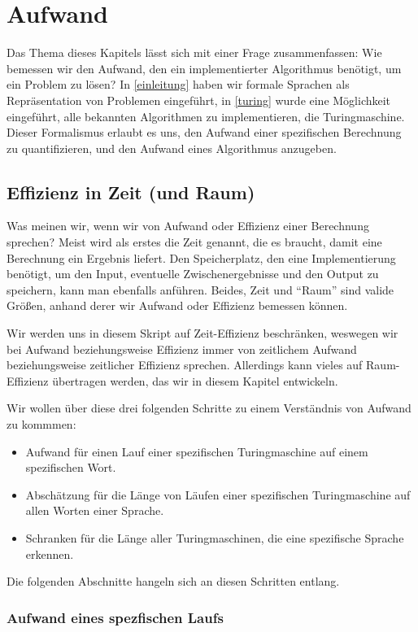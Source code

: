 \chapter{Aufwand}
Das Thema dieses Kapitels lässt sich mit einer Frage zusammenfassen:
Wie bemessen wir den Aufwand,
den ein implementierter Algorithmus benötigt, um ein Problem zu lösen?
In \autoref{einleitung} haben wir formale Sprachen als Repräsentation von Problemen eingeführt,
in \autoref{turing} wurde eine Möglichkeit eingeführt,
alle bekannten Algorithmen zu implementieren,
die Turingmaschine.
Dieser Formalismus erlaubt es uns,
den Aufwand einer spezifischen Berechnung zu quantifizieren,
und den Aufwand eines Algorithmus anzugeben.

\section{Effizienz in Zeit (und Raum)}

Was meinen wir, wenn wir von Aufwand oder Effizienz einer Berechnung sprechen?
Meist wird als erstes die Zeit genannt,
die es braucht,
damit eine Berechnung ein Ergebnis liefert.
Den Speicherplatz,
den eine Implementierung benötigt,
um den Input,
eventuelle Zwischenergebnisse
und den Output zu speichern,
kann man ebenfalls anführen.
Beides, Zeit und ``Raum'' sind valide Größen,
anhand derer wir Aufwand oder Effizienz bemessen können.

Wir werden uns in diesem Skript auf Zeit-Effizienz beschränken,
weswegen wir bei Aufwand beziehungsweise Effizienz immer von
zeitlichem Aufwand beziehungsweise zeitlicher Effizienz sprechen.
Allerdings kann vieles auf Raum-Effizienz übertragen werden,
das wir in diesem Kapitel entwickeln.

Wir wollen über diese drei folgenden Schritte zu einem Verständnis von Aufwand zu kommmen:
\begin{itemize}
    \item Aufwand für einen Lauf einer spezifischen Turingmaschine auf einem spezifischen Wort.
    \item Abschätzung für die Länge von Läufen einer spezifischen Turingmaschine
        auf allen Worten einer Sprache.
    \item Schranken für die Länge aller Turingmaschinen, die eine spezifische Sprache erkennen.
\end{itemize}

Die folgenden Abschnitte hangeln sich an diesen Schritten entlang.

\subsection{Aufwand eines spezfischen Laufs}

